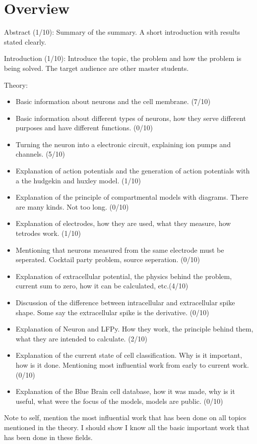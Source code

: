 \documentclass[altfont, fleqn]{uiophd}
\begin{document}
\chapter*{Overview}

Abstract (1/10):
\newline
Summary of the summary. A short introduction with results stated clearly.
\newline

Introduction (1/10):
\newline
Introduce the topic, the problem and how the problem is being solved. 
The target audience are other master students. 
\newline 

Theory:
\begin{itemize}
    \setlength\itemsep{0pt}
    \item Basic information about neurons and the cell membrane. (7/10)
    \item Basic information about different types of neurons, how they serve
        different purposes and have different functions. (0/10)
    \item Turning the neuron into a electronic circuit, explaining ion pumps and 
        channels. (5/10)
    \item Explanation of action potentials and the generation of
        action potentials with a the hudgekin and huxley model. (1/10)
    \item Explanation of the principle of compartmental models with diagrams.
        There are many kinds. Not too long. (0/10)
    \item Explanation of electrodes, how they are used,
        what they measure, how tetrodes work. (1/10)
    \item Mentioning that neurons measured from the same electrode must
        be seperated. Cocktail party problem, source seperation. (0/10)
    \item Explanation of extracellular potential, the physics behind the
        problem, current sum to zero, how it can be calculated, etc.(4/10)
    \item Discussion of the difference between intracellular and extracellular 
        spike shape. Some say the extracellular spike is the derivative. (0/10)
    \item Explanation of Neuron and LFPy. How they work, the principle 
        behind them, what they are intended to calculate. (2/10)
    \item Explanation of the current state of cell classification.
        Why is it important, how is it done. Mentioning most influential 
        work from early to current work. (0/10)
    \item Explanation of the Blue Brain cell database, how it was made, 
        why is it useful, what were the focus of the models, models are public. (0/10)
\end{itemize}
\noindent 
Note to self, mention the most influential work that has been done on all
topics mentioned in the theory. I should show I know all the basic 
important work that has been done in these fields. 
\newline
\end{document}
